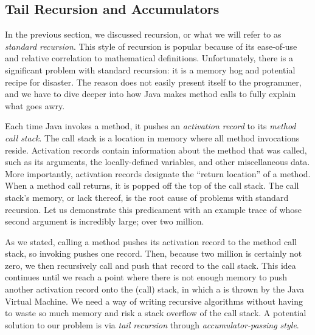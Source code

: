 \subsection{Tail Recursion and Accumulators}
In the previous section, we discussed recursion, or what we will refer to as \emph{standard recursion}. 
This style of recursion is popular because of its ease-of-use and relative correlation to mathematical definitions. 
Unfortunately, there is a significant problem with standard recursion: it is a memory hog and potential recipe for disaster. 
The reason does not easily present itself to the programmer, and we have to dive deeper into how Java makes method calls to fully explain what goes awry.

Each time Java invokes a method, it pushes an \emph{activation record} to its \emph{method call stack}. 
The call stack is a location in memory where all method invocations reside. 
Activation records contain information about the method that was called, such as its arguments, the locally-defined variables, and other miscellaneous data. 
More importantly, activation records designate the ``return location'' of a method. 
When a method call returns, it is popped off the top of the call stack. 
The call stack's memory, or lack thereof, is the root cause of problems with standard recursion. 
Let us demonstrate this predicament with an example trace of  whose second argument is incredibly large; over two million.

As we stated, calling a method pushes its activation record to the method call stack, so invoking  pushes one record. 
Then, because two million is certainly not zero, we then recursively call  and push that record to the call stack. 
This idea continues until we reach a point where there is not enough memory to push another activation record onto the (call) stack, in which a  is thrown by the Java Virtual Machine. 
We need a way of writing recursive algorithms without having to waste so much memory and risk a stack overflow of the call stack. 
A potential solution to our problem is via \emph{tail recursion} through \emph{accumulator-passing style}.

